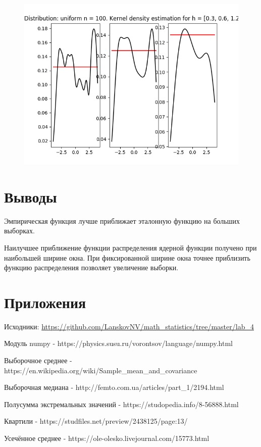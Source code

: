 \documentclass[12pt]{article}
\begin{document}
\begin{center}
\begin{figure}[H]
\includegraphics[width=\textwidth]{kernel/d_uniform100.png}
\end{figure}
\end{center}


\section{Выводы}
Эмпирическая функция лучше приближает эталонную функцию на больших выборках.

Наилучшее приближение функции распределения ядерной функции получено при наибольшей ширине окна. При фиксированной ширине окна точнее приблизить функцию распределения позволяет увеличение выборки.

\section{Приложения}

Исходники: \url{https://github.com/LanskovNV/math_statistics/tree/master/lab_4}

\begin{thebibliography}{}
      Модуль numpy  -  https://physics.susu.ru/vorontsov/language/numpy.html
    
    Выборочное среднее  -  https://en.wikipedia.org/wiki/Sample\_mean\_and\_covariance
    
    Выборочная медиана  -  http://femto.com.ua/articles/part\_1/2194.html
    
    Полусумма экстремальных значений  -  https://studopedia.info/8-56888.html
    
    Квартили  -  https://studfiles.net/preview/2438125/page:13/
    
      Усечённое среднее  -  https://ole-olesko.livejournal.com/15773.html
\end{thebibliography}
\end{document}
